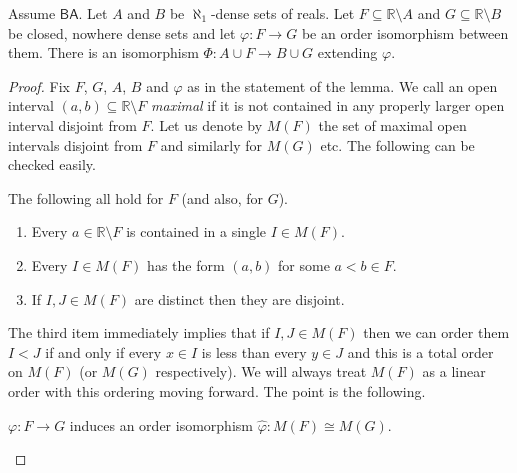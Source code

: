 \documentclass[10pt,a4paper]{amsart}
\def\BA{\mathsf{BA}}
\begin{document}
\begin{lemma} \label{key}
    Assume $\BA$. Let $A$ and $B$ be $\aleph_1$-dense sets of reals. Let $F \subseteq \mathbb R \setminus A$ and $G \subseteq \mathbb R \setminus B$ be closed, nowhere dense sets and let $\varphi:F \to G$ be an order isomorphism between them. There is an isomorphism $\Phi:A \cup F \to B \cup G$ extending $\varphi$.
\end{lemma}

\begin{proof}
    Fix $F$, $G$, $A$, $B$ and $\varphi$ as in the statement of the lemma. We call an open interval $(a, b) \subseteq \mathbb R \setminus F$ {\em maximal} if it is not contained in any properly larger open interval disjoint from $F$. Let us denote by $M(F)$ the set of maximal open intervals disjoint from $F$ and similarly for $M(G)$ etc. The following can be checked easily.

    \begin{fact}
        The following all hold for $F$ (and also, for $G$).
        \begin{enumerate}
            \item Every $a \in \mathbb R \setminus F$ is contained in a single $I \in M(F)$.
            \item Every $I \in M(F)$ has the form $(a, b)$ for some $a < b \in F$.
            \item If $I, J \in M(F)$ are distinct then they are disjoint.
        \end{enumerate}
    \end{fact}

    The third item immediately implies that if $I , J \in M(F)$ then we can order them $I < J$ if and only if every $x \in I$ is less than every $y \in J$ and this is a total order on $M(F)$ (or $M(G)$ respectively). We will always treat $M(F)$ as a linear order with this ordering moving forward. The point is the following.

    \begin{claim}
        $\varphi:F \to G$ induces an order isomorphism $\hat{\varphi}:M(F) \cong M(G)$.
    \end{claim}


\end{proof}
\end{document}

